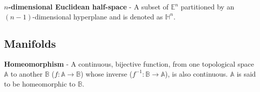 
\begin{defn}
  \textbf{$n$-dimensional Euclidean half-space} - A subset of $\mathbb{E}^n$
  partitioned by an $(n-1)$-dimensional hyperplane and is denoted
  as $\mathbb{H}^n$.
\end{defn}



\subsection{Manifolds}

\begin{defn}
  \textbf{Homeomorphism} - A continuous, bijective function, from one
  topological space $\mathbb{A}$ to another $\mathbb{B}$ ($f :\mathbb{A}
  \rightarrow \mathbb{B}$) whose inverse ($f^{-1}: \mathbb{B}
  \rightarrow \mathbb{A}$), is also continuous.
  $\mathbb{A}$ is said to be homeomorphic to $\mathbb{B}$.
\end{defn}


